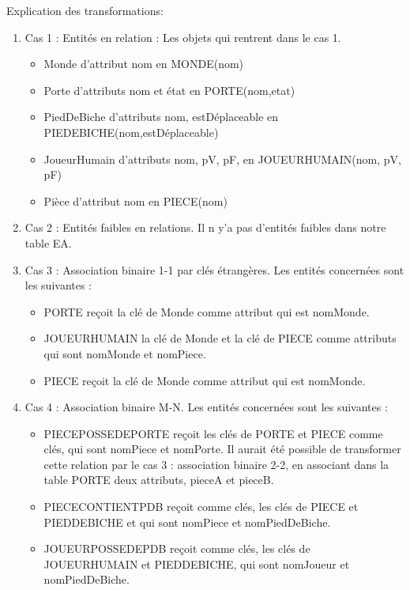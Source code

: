 \documentclass[a4paper, 12pt]{report}
\begin{document}
Explication des transformations:\\
\begin{enumerate}
    \item Cas 1 : Entités en relation : Les objets qui rentrent dans le cas 1.
    \begin{itemize}
	    \item Monde d'attribut nom en MONDE(nom)
	    \item Porte d'attributs nom et état en PORTE(nom,etat)
	    \item PiedDeBiche d'attributs nom, estDéplaceable en PIEDEBICHE(nom,estDéplaceable)
	    \item JoueurHumain d'attributs nom, pV, pF, en JOUEURHUMAIN(nom, pV, pF)
	    \item Pièce d'attribut nom en PIECE(nom)
    \end{itemize}
    \item Cas 2 : Entités faibles en relations.
    Il n y'a pas d'entités faibles dans notre table EA.
    \item Cas 3 : Association binaire 1-1 par clés étrangères. Les entités concernées sont les suivantes : 
    \begin{itemize}
           \item PORTE reçoit la clé de Monde comme attribut qui est nomMonde.
           \item JOUEURHUMAIN la clé de Monde et la clé de PIECE comme attributs qui sont nomMonde et nomPiece.
           \item PIECE reçoit la clé de Monde comme attribut qui est nomMonde.
     \end{itemize}
     \item Cas 4 : Association binaire M-N. Les entités concernées sont les suivantes :
     \begin{itemize}
     	\item PIECEPOSSEDEPORTE reçoit les clés de PORTE et PIECE comme clés, qui sont nomPiece et nomPorte. Il aurait été possible de transformer cette relation par le cas 3 : association binaire 2-2, en associant dans la table PORTE deux attributs, pieceA et pieceB.
     	\item PIECECONTIENTPDB reçoit comme clés, les clés de PIECE et PIEDDEBICHE et qui sont nomPiece et nomPiedDeBiche.
     	\item JOUEURPOSSEDEPDB reçoit comme clés, les clés de JOUEURHUMAIN et PIEDDEBICHE, qui sont nomJoueur et nomPiedDeBiche.
     \end{itemize}
    
\end{enumerate}
\end{document}
